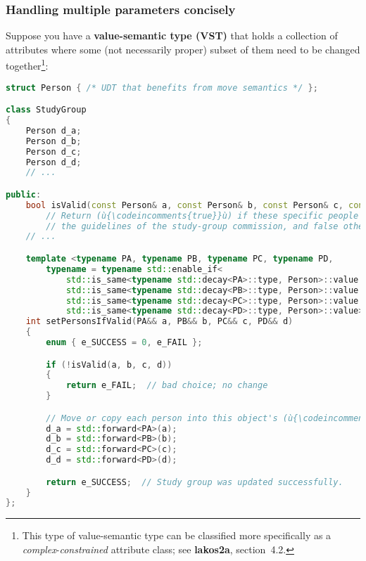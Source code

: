 \subsubsection[Handling multiple parameters concisely]{Handling multiple parameters concisely}\label{handling-multiple-parameters-concisely}

Suppose you have a \textbf{value-semantic type (VST)} that holds a
collection of attributes where some (not necessarily proper) subset of
them need to be changed together{\cprotect\footnote{This type of
value-semantic type can be classified more specifically as a
\emph{complex}-\emph{constrained} attribute class; see \textbf{lakos2a}, section~4.2.}}:

\begin{lstlisting}[language=C++]
struct Person { /* UDT that benefits from move semantics */ };

class StudyGroup
{
    Person d_a;
    Person d_b;
    Person d_c;
    Person d_d;
    // ...

public:
    bool isValid(const Person& a, const Person& b, const Person& c, const Person& d);
        // Return (ù{\codeincomments{true}}ù) if these specific people form a valid study group under
        // the guidelines of the study-group commission, and false otherwise.
    // ...

    template <typename PA, typename PB, typename PC, typename PD,
        typename = typename std::enable_if<
            std::is_same<typename std::decay<PA>::type, Person>::value &&
            std::is_same<typename std::decay<PB>::type, Person>::value &&
            std::is_same<typename std::decay<PC>::type, Person>::value &&
            std::is_same<typename std::decay<PD>::type, Person>::value>::type>
    int setPersonsIfValid(PA&& a, PB&& b, PC&& c, PD&& d)
    {
        enum { e_SUCCESS = 0, e_FAIL };

        if (!isValid(a, b, c, d))
        {
            return e_FAIL;  // bad choice; no change
        }

        // Move or copy each person into this object's (ù{\codeincomments{Person}}ù) data members:
        d_a = std::forward<PA>(a);
        d_b = std::forward<PB>(b);
        d_c = std::forward<PC>(c);
        d_d = std::forward<PD>(d);

        return e_SUCCESS;  // Study group was updated successfully.
    }
};
\end{lstlisting}

